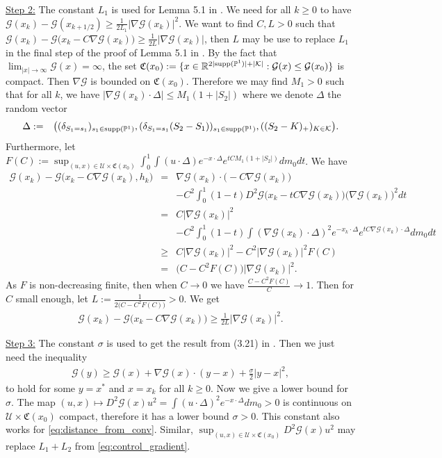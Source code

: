 \documentclass{amsart}%
\def\be{\begin{eqnarray}}
\def\ee{\end{eqnarray}}
\def\b*{\begin{eqnarray*}}
\def\e*{\end{eqnarray*}}
\def \P{{\mathbb P}}
\def \R{\mathbb{R}}
\def\Gc{{\cal G}}
\def\Kc{{\cal K}}
\def\Uc{{\cal U}}
\def\no{\noindent}
\def\x{\times}
\theoremstyle{definition}
\theoremstyle{remark}
\newcommand{\cal}{\mathcal}
\begin{document}
\no\underline{\rm Step 2:} The constant $L_1$ is used for Lemma 5.1 in \cite{beck2013convergence}. We need for all $k\ge 0$ to have $\Gc(x_k)-\Gc(x_{k+1/2})\ge \frac{1}{2 L_1}|\nabla \Gc(x_k)|^2$. We want to find $C,L>0$ such that $\Gc(x_k)-\Gc\big(x_k-C\nabla\Gc(x_k)\big)\ge \frac{1}{2L}|\nabla\Gc(x_k)|$, then $L$ may be use to replace $L_1$ in the final step of the proof of Lemma 5.1 in \cite{beck2013convergence}. By the fact that $\lim_{|x|\to\infty}\Gc(x) = \infty$, the set ${\mathfrak C}(x_0):=\{x\in\R^{2|{\rm supp}(\P^1)|+|\Kc|}:\Gc(x)\le \Gc(x_0)\}$ is compact. Then $\nabla \Gc$ is bounded on ${\mathfrak C}(x_0)$. Therefore we may find $M_1>0$ such that for all $k$, we have $|\nabla\Gc(x_k)\cdot\Delta|\le M_1(1+|S_2|)$ where we denote $\Delta$ the random vector
\b*
\Delta &:=& \big((\delta_{S_1 = s_1})_{s_1\in{\rm supp}(\P^1)},(\delta_{S_1 = s_1}(S_2-S_1))_{s_1\in{\rm supp}(\P^1)},((S_2-K)_+)_{K\in\Kc}\big).
\e*
Furthermore, let $F(C):=\sup_{(u,x)\in\Uc\x{\mathfrak C}(x_0)}\int_0^1\int (u\cdot\Delta)e^{-x\cdot \Delta}e^{tCM_1(1+|S_2|)}dm_0dt$. We have
\b*
\Gc(x_k)-\Gc\big(x_k-C\nabla\Gc(x_k),h_k\big) &=& \nabla\Gc(x_k)\cdot \big(-C\nabla\Gc(x_k)\big)\\
&&-C^2\int_0^1 (1-t) D^2 \Gc\big(x_k-tC\nabla\Gc(x_k)\big)\big(\nabla\Gc(x_k)\big)^2 dt\\
&=&C|\nabla\Gc(x_k)|^2\\
&&-C^2\int_0^1 (1-t) \int (\nabla\Gc(x_k)\cdot\Delta)^2e^{-x_k\cdot\Delta} e^{tC\nabla\Gc(x_k)\cdot\Delta}dm_0 dt\\
&\ge& C|\nabla\Gc(x_k)|^2-C^2|\nabla\Gc(x_k)|^2F(C)\\
&=&\big(C-C^2F(C)\big)|\nabla\Gc(x_k)|^2.
\e*
As $F$ is non-decreasing finite, then when $C\longrightarrow 0$ we have $\frac{C-C^2F(C)}{C}\longrightarrow 1$. Then for $C$ small enough, let $L:= \frac{1}{2\big(C-C^2F(C)\big)}>0$. We get
\b*
\Gc(x_k)-\Gc\big(x_k-C\nabla\Gc(x_k)\big)\ge \frac{1}{2L}|\nabla\Gc(x_k)|^2.
\e*

\no\underline{\rm Step 3:} The constant $\sigma$ is used to get the result from (3.21) in \cite{beck2013convergence}. Then we just need the inequality
\be\label{eq:ineq_sec_order}
\Gc(y)\ge \Gc(x)+\nabla \Gc(x)\cdot(y-x)+\frac{\sigma}{2}|y-x|^2,
\ee
to hold for some $y =x^*$ and $x = x_k$ for all $k\ge 0$. Now we give a lower bound for $\sigma$. The map $(u,x)\longmapsto D^2\Gc(x)u^2=\int (u\cdot\Delta)^2e^{-x\cdot\Delta}dm_0>0$ is continuous on $\Uc\x {\mathfrak C}(x_0)$ compact, therefore it has a lower bound $\sigma>0$. This constant also works for \eqref{eq:distance_from_conv}. Similar, $\sup_{(u,x)\in \Uc\x {\mathfrak C}(x_0)}D^2\Gc(x)u^2$ may replace $L_1+L_2$ from \eqref{eq:control_gradient}.
\end{document}
